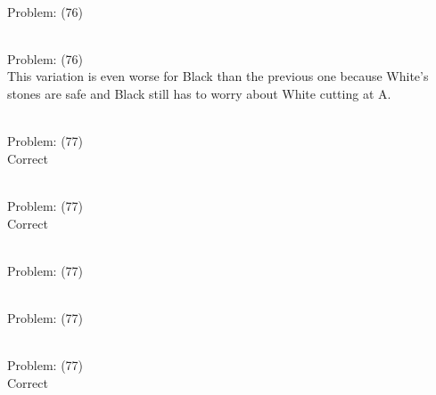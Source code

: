 \documentclass[11pt]{article}
\begin{document}
\begin{minipage}[t]{0.5\textwidth}
  {\centering
  
\\
Problem: (76)\\
  }
\end{minipage}
\begin{minipage}[t]{0.5\textwidth}
  {\centering
  
\\
Problem: (76)\\
This variation is even worse for Black than the previous one because White's stones are safe and Black still has to worry about White cutting at A.\\
  }
\end{minipage}
\begin{minipage}[t]{0.5\textwidth}
  {\centering
  
\\
Problem: (77)\\
Correct\\
  }
\end{minipage}
\begin{minipage}[t]{0.5\textwidth}
  {\centering
  
\\
Problem: (77)\\
Correct\\
  }
\end{minipage}
\begin{minipage}[t]{0.5\textwidth}
  {\centering
  
\\
Problem: (77)\\
  }
\end{minipage}
\begin{minipage}[t]{0.5\textwidth}
  {\centering
  
\\
Problem: (77)\\
  }
\end{minipage}
\begin{minipage}[t]{0.5\textwidth}
  {\centering
  
\\
Problem: (77)\\
Correct\\
  }
\end{minipage}
\end{document}
